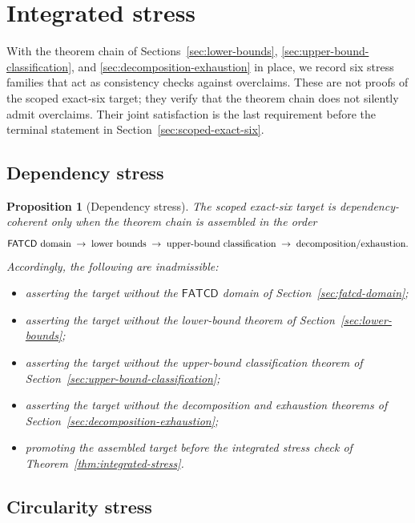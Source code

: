 \documentclass[11pt]{article}
\newtheorem{proposition}[theorem]{Proposition}
\theoremstyle{definition}
\newcommand{\FATCD}{\ensuremath{\mathsf{FATCD}}}
\begin{document}
 \section{Integrated stress}\label{sec:integrated-stress}




With the theorem chain of Sections~\ref{sec:lower-bounds},
\ref{sec:upper-bound-classification}, and
\ref{sec:decomposition-exhaustion} in place, we record six stress
families that act as consistency checks against overclaims. These are
not proofs of the scoped exact-six target; they verify that the
theorem chain does not silently admit overclaims. Their joint
satisfaction is the last requirement before the terminal statement in
Section~\ref{sec:scoped-exact-six}.

\subsection{Dependency stress}\label{subsec:dependency-stress}

\begin{proposition}[Dependency stress]\label{prop:dependency-stress}
The scoped exact-six target is dependency-coherent only when the theorem
chain is assembled in the order
\[
\text{\FATCD{} domain} \;\rightarrow\; \text{lower bounds} \;\rightarrow\;
\text{upper-bound classification} \;\rightarrow\;
\text{decomposition/exhaustion}.
\]
Accordingly, the following are inadmissible:
\begin{itemize}[topsep=2pt,itemsep=1pt]
  \item asserting the target without the \FATCD{} domain of
    Section~\ref{sec:fatcd-domain};
  \item asserting the target without the lower-bound theorem of
    Section~\ref{sec:lower-bounds};
  \item asserting the target without the upper-bound classification
    theorem of Section~\ref{sec:upper-bound-classification};
  \item asserting the target without the decomposition and exhaustion
    theorems of Section~\ref{sec:decomposition-exhaustion};
  \item promoting the assembled target before the integrated stress
    check of Theorem~\ref{thm:integrated-stress}.
\end{itemize}
\end{proposition}

\subsection{Circularity stress}\label{subsec:circularity-stress}
\end{document}
